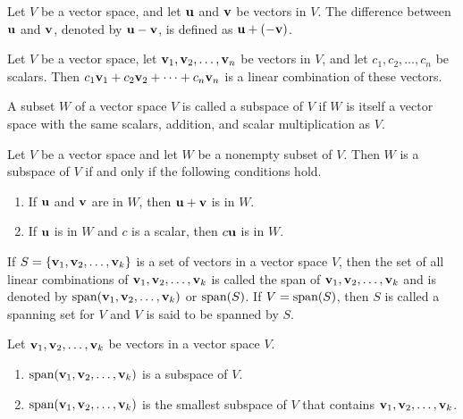 \documentclass[../m73main.tex]{subfiles}
\begin{document}
\begin{definition}
	Let $V$ be a vector space, and let $\mathbf{u}$ and $\mathbf{v}$ be vectors in $V$.
	The difference between $\mathbf{u}$ and $\mathbf{v}$, denoted by $\mathbf{u} - \mathbf{v}$, is defined as $\mathbf{u} + (-\mathbf{v})$.
\end{definition}

\begin{definition}
	Let $V$ be a vector space, let $\mathbf{v}_1, \mathbf{v}_2, \ldots, \mathbf{v}_n$ be vectors in $V$, and let $c_1, c_2, \ldots, c_n$ be scalars.
	Then $c_1\mathbf{v}_1 + c_2\mathbf{v}_2 + \cdots + c_n \mathbf{v}_n$ is a linear combination of these vectors.
\end{definition}

\begin{definition}[Subspace]
	A subset $W$ of a vector space $V$ is called a subspace of $V$ if $W$ is itself a vector space with the same scalars, addition, and scalar multiplication as $V$.
\end{definition}

\begin{theorem}
	Let $V$ be a vector space and let $W$ be a nonempty subset of $V$.
	Then $W$ is a subspace of $V$ if and only if the following conditions hold.
	\begin{enumerate}[label=(\alph*)]
		\item If $\mathbf{u}$ and $\mathbf{v}$ are in $W$, then $\mathbf{u} + \mathbf{v}$ is in $W$.
		\item If $\mathbf{u}$ is in $W$ and $c$ is a scalar, then $c \mathbf{u}$ is in $W$.
	\end{enumerate}
\end{theorem}

\begin{definition}[Span]
	If $S = \{\mathbf{v}_1, \mathbf{v}_2, \ldots, \mathbf{v}_{k}\}$ is a set of vectors in a vector space $V$, then the set of all linear combinations of $\mathbf{v}_1, \mathbf{v}_2, \ldots, \mathbf{v}_k$ is called the span of $\mathbf{v}_1, \mathbf{v}_2, \ldots, \mathbf{v}_k$ and is denoted by $\textrm{span}(\mathbf{v}_1, \mathbf{v}_2, \ldots, \mathbf{v}_k)$ or $\textrm{span}(S)$.
	If $V = \textrm{span}(S)$, then $S$ is called a spanning set for $V$ and $V$ is said to be spanned by $S$.
\end{definition}

\begin{theorem}
	Let $\mathbf{v}_1, \mathbf{v}_2, \ldots, \mathbf{v}_k$ be vectors in a vector space $V$.
	\begin{enumerate}[label=(\alph*)]
		\item $\textrm{span}(\mathbf{v}_1, \mathbf{v}_2, \ldots, \mathbf{v}_k)$ is a subspace of $V$.
		\item $\textrm{span}(\mathbf{v}_1, \mathbf{v}_2, \ldots, \mathbf{v}_k)$ is the smallest subspace of $V$ that contains $\mathbf{v}_1, \mathbf{v}_2, \ldots, \mathbf{v}_k$.
	\end{enumerate}
\end{theorem}
\end{document}
